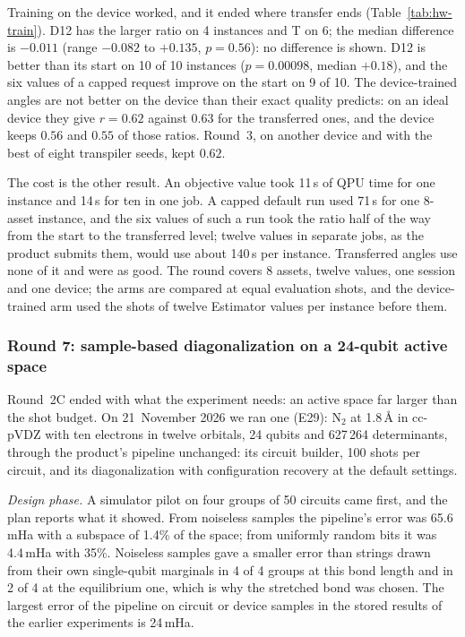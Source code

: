 \documentclass[11pt,a4paper]{article}
\begin{document}
Training on the device worked, and it ended where transfer ends
(Table~\ref{tab:hw-train}). D12 has the larger ratio on 4 instances and T
on 6; the median difference is $-0.011$ (range $-0.082$ to $+0.135$,
$p = 0.56$): no difference is shown. D12 is better than its start on 10 of
10 instances ($p = 0.00098$, median $+0.18$), and the six values of a
capped request improve on the start on 9 of 10. The device-trained angles
are not better on the device than their exact quality predicts: on an ideal
device they give $r = 0.62$ against $0.63$ for the transferred ones, and
the device keeps $0.56$ and $0.55$ of those ratios. Round~3, on another
device and with the best of eight transpiler seeds, kept $0.62$.

The cost is the other result. An objective value took 11\,s of QPU time for
one instance and 14\,s for ten in one job. A capped default run used
71\,s for one 8-asset instance, and the six values of such a run took the
ratio half of the way from the start to the transferred level; twelve values in separate jobs, as the
product submits them, would use about 140\,s per instance. Transferred
angles use none of it and were as good. The round covers 8 assets, twelve
values, one session and one device; the arms are compared at equal
evaluation shots, and the device-trained arm used the shots of twelve
Estimator values per instance before them.

\subsubsection{Round 7: sample-based diagonalization on a 24-qubit active space}
\label{sec:res-hw7}

Round~2C ended with what the experiment needs: an active space far larger
than the shot budget. On 21~November 2026 we ran one (E29): N$_2$ at
1.8\,\AA{} in cc-pVDZ with ten electrons in twelve orbitals, 24 qubits and
627\,264 determinants, through the product's pipeline unchanged: its
circuit builder, 100 shots per circuit, and its diagonalization with
configuration recovery at the default settings.

\emph{Design phase.} A simulator pilot on four groups of 50 circuits came
first, and the plan reports what it showed. From noiseless samples the
pipeline's error was 65.6\,mHa with a subspace of 1.4\% of the space; from
uniformly random bits it was 4.4\,mHa with 35\%. Noiseless samples gave a
smaller error than strings drawn from their own single-qubit marginals in
4 of 4 groups at this bond length and in 2 of 4 at the equilibrium one,
which is why the stretched bond was chosen. The largest error of
the pipeline on circuit or device samples in the stored results of the
earlier experiments is 24\,mHa.
\end{document}
